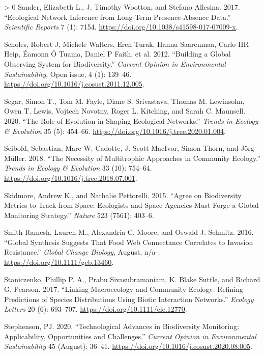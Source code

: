 \documentclass[11pt]{article}
\newlength{\cslhangindent}
\newenvironment{CSLReferences}[3] %
 {%
  \setlength{\parindent}{0pt}
  \ifodd #1 \everypar{\setlength{\hangindent}{\cslhangindent}}\ignorespaces\fi
  \ifnum #2 > 0
  \setlength{\parskip}{#2\baselineskip}
  \fi
 }%
 {}
\begin{document}
\begin{CSLReferences}{1}{0}
\leavevmode\hypertarget{ref-Sander2017EcoNet}{}%
Sander, Elizabeth L., J. Timothy Wootton, and Stefano Allesina. 2017.
{``Ecological Network Inference from Long-Term Presence-Absence Data.''}
\emph{Scientific Reports} 7 (1): 7154.
\url{https://doi.org/10.1038/s41598-017-07009-x}.

\leavevmode\hypertarget{ref-Scholes2012BuiGlo}{}%
Scholes, Robert J, Michele Walters, Eren Turak, Hannu Saarenmaa, Carlo
HR Heip, Éamonn Ó Tuama, Daniel P Faith, et al. 2012. {``Building a
Global Observing System for Biodiversity.''} \emph{Current Opinion in
Environmental Sustainability}, Open issue, 4 (1): 139--46.
\url{https://doi.org/10.1016/j.cosust.2011.12.005}.

\leavevmode\hypertarget{ref-Segar2020RolEvo}{}%
Segar, Simon T., Tom M. Fayle, Diane S. Srivastava, Thomas M. Lewinsohn,
Owen T. Lewis, Vojtech Novotny, Roger L. Kitching, and Sarah C.
Maunsell. 2020. {``The Role of Evolution in Shaping Ecological
Networks.''} \emph{Trends in Ecology \& Evolution} 35 (5): 454--66.
\url{https://doi.org/10.1016/j.tree.2020.01.004}.

\leavevmode\hypertarget{ref-Seibold2018NecMul}{}%
Seibold, Sebastian, Marc W. Cadotte, J. Scott MacIvor, Simon Thorn, and
Jörg Müller. 2018. {``The Necessity of Multitrophic Approaches in
Community Ecology.''} \emph{Trends in Ecology \& Evolution} 33 (10):
754--64. \url{https://doi.org/10.1016/j.tree.2018.07.001}.

\leavevmode\hypertarget{ref-Skidmore2015AgrBio}{}%
Skidmore, Andrew K., and Nathalie Pettorelli. 2015. {``Agree on
Biodiversity Metrics to Track from Space: Ecologists and Space Agencies
Must Forge a Global Monitoring Strategy.''} \emph{Nature} 523 (7561):
403--6.

\leavevmode\hypertarget{ref-Smith-Ramesh2016GloSyn}{}%
Smith-Ramesh, Lauren M., Alexandria C. Moore, and Oswald J. Schmitz.
2016. {``Global Synthesis Suggests That Food Web Connectance Correlates
to Invasion Resistance.''} \emph{Global Change Biology}, August, n/a--.
\url{https://doi.org/10.1111/gcb.13460}.

\leavevmode\hypertarget{ref-Staniczenko2017LinMac}{}%
Staniczenko, Phillip P. A., Prabu Sivasubramaniam, K. Blake Suttle, and
Richard G. Pearson. 2017. {``Linking Macroecology and Community Ecology:
Refining Predictions of Species Distributions Using Biotic Interaction
Networks.''} \emph{Ecology Letters} 20 (6): 693--707.
\url{https://doi.org/10.1111/ele.12770}.

\leavevmode\hypertarget{ref-Stephenson2020TecAdv}{}%
Stephenson, PJ. 2020. {``Technological Advances in Biodiversity
Monitoring: Applicability, Opportunities and Challenges.''}
\emph{Current Opinion in Environmental Sustainability} 45 (August):
36--41. \url{https://doi.org/10.1016/j.cosust.2020.08.005}.


\end{CSLReferences}
\end{document}
